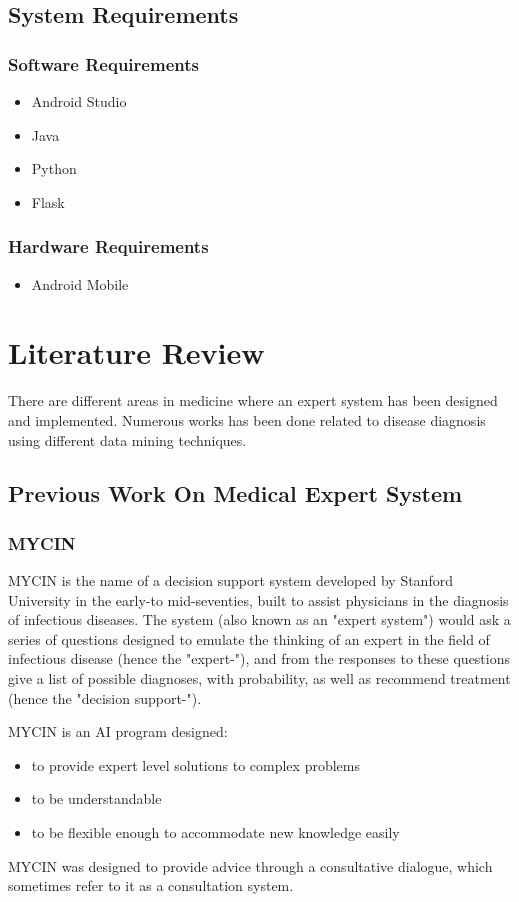 \section{System Requirements}\label{sec:sr}%
\subsection{Software Requirements}
\begin{itemize}
    \item Android Studio
    \item Java
    \item Python
    \item Flask
\end{itemize}

\subsection{Hardware Requirements}
\begin{itemize}
    \item Android Mobile
\end{itemize}


\chapter{Literature Review}
There are different areas in medicine where an expert system has  been  designed  and  implemented. Numerous works has been done related to disease diagnosis using different data mining techniques. 


\section{Previous Work On Medical Expert System}
\subsection{MYCIN}
MYCIN is the name of a decision support system developed by Stanford University in the early-to mid-seventies, built to assist physicians in the diagnosis of infectious diseases. The system (also known as an "expert system") would ask a series of questions designed to emulate the thinking of an expert in the field of infectious disease (hence the "expert-"), and from the responses to these questions give a list of possible diagnoses, with probability, as well as recommend treatment (hence the "decision support-").\par 
MYCIN is an AI program designed:
\begin{itemize}
    \item to provide expert level solutions to complex problems
    \item to be understandable
    \item to be flexible enough to accommodate new knowledge easily
\end{itemize}
MYCIN was designed to provide advice through a consultative dialogue, which sometimes refer to it as a consultation system.

